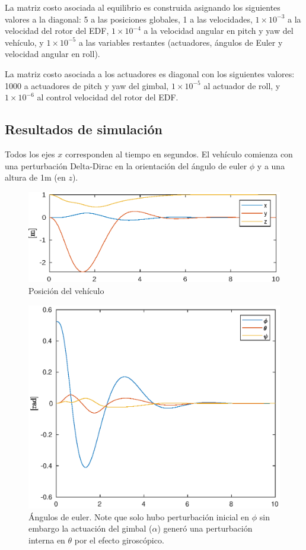 La matriz costo asociada al equilibrio es construida asignando los siguientes valores a la diagonal: 5 a las posiciones globales, 1 a las velocidades, $1\times10^{-3}$ a la velocidad del rotor del EDF, $1\times10^{-4}$ a la velocidad angular en pitch y yaw del vehículo, y $1\times10^{-5}$ a las variables restantes (actuadores, ángulos de Euler y velocidad angular en roll).

\medskip

La matriz costo asociada a los actuadores es diagonal con los siguientes valores: 1000 a actuadores de pitch y yaw del gimbal, $1\times10^{-5}$ al actuador de roll, y $1\times10^{-6}$ al control velocidad del rotor del EDF.


\subsection{Resultados de simulación}

Todos los ejes $x$ corresponden al tiempo en segundos. El vehículo comienza con una perturbación Delta-Dirac en la orientación del ángulo de euler $\phi$ y a una altura de 1m (en $z$).

\begin{figure}[!ht]
    \centering
    \includegraphics[width=0.8\linewidth]{fig/pos_edf}
    \caption{Posición del vehículo}
    \label{fig:pos_edf}
\end{figure}

\begin{figure}[!ht]
    \centering
    \includegraphics[width=0.6\linewidth]{fig/eulerang_edf}
    \caption{Ángulos de euler. Note que solo hubo perturbación inicial en $\phi$ sin embargo la actuación del gimbal ($\alpha$) generó una perturbación interna en $\theta$ por el efecto giroscópico.}
    \label{fig:eulerang_edf}
\end{figure}

